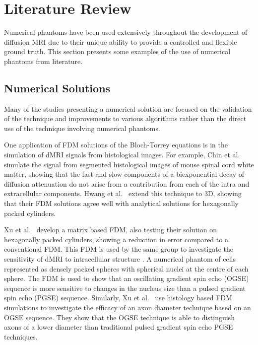 \chapter{Literature Review}
\label{sec:literature_review}
Numerical phantoms have been used extensively throughout the development of diffusion MRI due to their unique ability to provide a controlled and flexible ground truth. This section presents some examples of the use of numerical phantoms from literature.


 

\section{Numerical Solutions}
\label{sec:app_numerical_solutions}
Many of the studies presenting a numerical solution are focused on the validation of the technique and improvements to various algorithms rather than the direct use of the technique involving numerical phantoms.

One application of FDM solutions of the Bloch-Torrey equations is in the simulation of dMRI signals from histological images.
For example, Chin et al.\ \cite{Chin2002} simulate the signal from segmented histological images of mouse spinal cord white matter, showing that the fast and slow components of a biexponential decay of diffusion attenuation do not arise from a contribution from each of the intra and extracellular components.
Hwang et al.\ \cite{Hwang2003} extend this technique to 3D, showing that their FDM solutions agree well with analytical solutions for hexagonally packed cylinders. 

Xu et al.\ \cite{Xu2007} develop a matrix based FDM, also testing their solution on hexagonally packed cylinders, showing a reduction in error compared to a conventional FDM.
This FDM is used by the same group to investigate the sensitivity of dMRI to intracellular structure \cite{Xu2009}.
A numerical phantom of cells represented as densely packed spheres with spherical nuclei at the centre of each sphere.
The FDM is used to show that an oscillating gradient spin echo (OGSE) sequence is more sensitive to changes in the nucleus size than a pulsed gradient spin echo (PGSE) sequence.
Similarly, Xu et al.\ \cite{Xu2014} use histology based FDM simulations to investigate the efficacy of an axon diameter technique based on an OGSE sequence. They show that the OGSE technique is able to distinguish axons of a lower diameter than traditional pulsed gradient spin echo PGSE techniques. 

